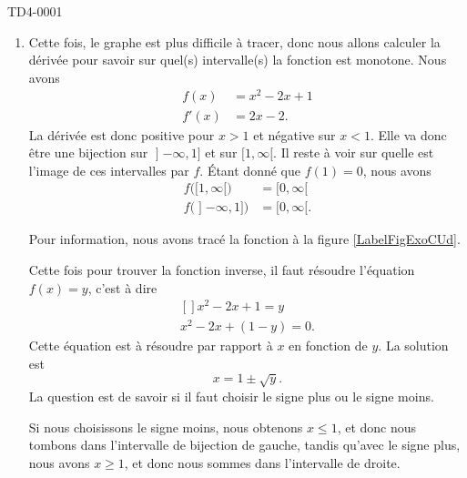 \begin{corrige}{TD4-0001}
\begin{enumerate}
		\item
			Cette fois, le graphe est plus difficile à tracer, donc nous allons calculer la dérivée pour savoir sur quel(s) intervalle(s) la fonction est monotone. Nous avons
			\begin{subequations}
				\begin{align}
					f(x)&=x^2-2x+1\\
					f'(x)&=2x-2.
				\end{align}
			\end{subequations}
			La dérivée est donc positive pour $x>1$ et négative sur $x<1$. Elle va donc être une bijection sur $\mathopen] -\infty , 1 \mathclose]$ et sur $\mathopen[ 1 , \infty [$. Il reste à voir sur quelle est l'image de ces intervalles par $f$. Étant donné que $f(1)=0$, nous avons
			\begin{subequations}
				\begin{align}
					f\big( \mathopen[ 1 , \infty [ \big)&=\mathopen[ 0 , \infty [\\
					f\big( \mathopen] -\infty , 1 \mathclose] \big)&=\mathopen[ 0 , \infty [.
				\end{align}
			\end{subequations}
			
			Pour information, nous avons tracé la fonction à la figure \ref{LabelFigExoCUd}.
			\newcommand{\CaptionFigExoCUd}{La fonction de l'exerice \ref{exoTD4-0001}.\ref{ItemexoTD1ii}. Remarquer la symétrie autour du sommet, comme toute fonction du second degré. Pour un $y$ donné, il y a \emph{deux} $x$ sur lesquels fa fonction vaut $y$.}


			Cette fois pour trouver la fonction inverse, il faut résoudre l'équation $f(x)=y$, c'est à dire
			\begin{equation}
				\begin{aligned}[]
					x^2-2x+1=y\\
					x^2-2x+(1-y)=0.
				\end{aligned}
			\end{equation}
			Cette équation est à résoudre par rapport à $x$ en fonction de $y$. La solution est 
			\begin{equation}
				x=1\pm\sqrt{y}.
			\end{equation}
			La question est de savoir si il faut choisir le signe plus ou le signe moins.
			
			Si nous choisissons le signe moins, nous obtenons $x\leq 1$, et donc nous tombons dans l'intervalle de bijection de gauche, tandis qu'avec le signe plus, nous avons $x\geq 1$, et donc nous sommes dans l'intervalle de droite.


\end{enumerate}
\end{corrige}
